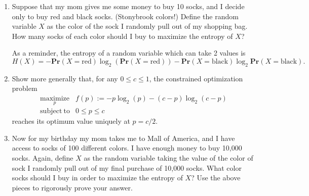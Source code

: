\documentclass{article}
\newcommand{\maximize}[1]{\underset{#1}{\text{maximize}}}
\newcommand{\pr}{\mathbf{Pr}}
\newcommand{\subjto}{\mathrm{subject~to}}
\begin{document}
\begin{enumerate}
\begin{enumerate}
\item Suppose  that my mom gives me some money to buy 10 socks, and I decide only to buy red and black socks. (Stonybrook colors!) Define the random variable $X$ as the color of the sock I randomly pull out of my shopping bag. How many socks of each color should I buy to maximize the entropy of $X$? 

As a reminder, the entropy of a random variable which can take 2 values is 
\[
H(X) = -\pr(X=\text{red})\log_2(\pr(X=\text{red})) - \pr(X=\text{black})\log_2\pr(X=\text{black}).
\]



\item Show more generally that, for any $0 \leq c \leq 1$, the constrained optimization problem 
\[
\begin{array}{ll}
\maximize{p} & f(p):=-p\log_2(p) - (c-p)\log_2(c-p)\\
\subjto & 0 \leq p \leq c
\end{array}
\]
reaches its optimum value uniquely at $p = c/2$.



\item Now for my birthday my mom takes me to Mall of America, and I have access to socks of 100 different colors. I have enough money to buy 10,000 socks. Again, define $X$ as the random variable taking the value of the color of sock I randomly pull out of my final purchase of 10,000 socks. What color socks should I buy in order to maximize the entropy of $X$? Use the above pieces to rigorously prove your answer. 



\end{enumerate}


\end{enumerate}
\end{document}
